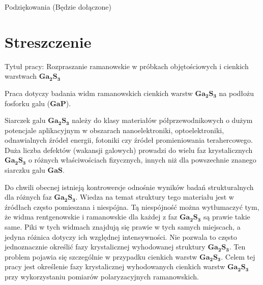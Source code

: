 Podziękowania (Będzie dołączone)

\vspace{10cm}



\newpage

\section*{Streszczenie}

Tytuł pracy: Rozpraszanie ramanowskie w próbkach objętościowych i cienkich warstwach $\mathbf{Ga_{2}S_{3}}$

\vspace{10mm}

Praca dotyczy badania widm ramanowskich cienkich warstw $\mathbf{Ga_{2}S_{3}}$ na podłożu fosforku galu ($\mathbf{GaP}$).

Siarczek galu $\mathbf{Ga_{2}S_{3}}$ należy do klasy materiałów półprzewodnikowych o dużym potencjale aplikacyjnym w obszarach nanoelektroniki, optoelektroniki, odnawialnych źródeł energii, fotoniki czy źródeł promieniowania terahercowego. Duża liczba defektów (wakansji galowych) prowadzi do wielu faz krystalicznych $\mathbf{Ga_{2}S_{3}}$ o różnych właściwościach fizycznych, innych niż dla powszechnie znanego siarczku galu $\mathbf{GaS}$.

Do chwili obecnej istnieją kontrowersje odnośnie wyników badań strukturalnych dla różnych faz $\mathbf{Ga_{2}S_{3}}$. Wiedza na temat struktury tego materiału jest w źródłach często pomieszana i niespójna. Tą niespójność można wytłumaczyć tym, że widma rentgenowskie i ramanowskie dla każdej z faz $\mathbf{Ga_{2}S_{3}}$ są prawie takie same. Piki w tych widmach znajdują się prawie w tych samych miejscach, a jedyna różnica dotyczy ich względnej intensywności. Nie pozwala to często jednoznacznie określić fazy krystalicznej wyhodowanej struktury $\mathbf{Ga_{2}S_{3}}$. Ten problem pojawia się szczególnie w przypadku cienkich warstw $\mathbf{Ga_{2}S_{3}}$. Celem tej pracy jest określenie fazy krystalicznej wyhodowanych cienkich warstw $\mathbf{Ga_{2}S_{3}}$ przy wykorzystaniu pomiarów polaryzacyjnych ramanowskich.

